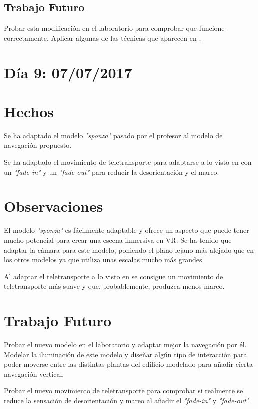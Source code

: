 \documentclass[12pt,a4paper]{article}
\begin{document}
\subsection{Trabajo Futuro}

Probar esta modificación en el laboratorio para comprobar que funcione correctamente.
Aplicar algunas de las técnicas que aparecen en \cite{Jerald 2016}.

\section{Día 9: 07/07/2017}

\section{Hechos}

Se ha adaptado el modelo \textit{"sponza"} pasado por el profesor al modelo de navegación propuesto.

Se ha adaptado el movimiento de teletransporte para adaptarse a lo visto en \cite{Jerald 2016} con un \textit{"fade-in"} y un \textit{"fade-out"} para reducir la desorientación y el mareo.

\section{Observaciones}

El modelo \textit{"sponza"} es fácilmente adaptable y ofrece un aspecto que puede tener mucho potencial para crear una escena inmersiva en VR. Se ha tenido que adaptar la cámara para este modelo, poniendo el plano lejano más alejado que en los otros modelos ya que utiliza unas escalas mucho más grandes.

Al adaptar el teletransporte a lo visto en \cite{Jerald 2016} se consigue un movimiento de teletransporte más suave y que, probablemente, produzca menos mareo.

\section{Trabajo Futuro}

Probar el nuevo modelo en el laboratorio y adaptar mejor la navegación por él. Modelar la iluminación de este modelo y diseñar algún tipo de interacción para poder moverse entre las distintas plantas del edificio modelado para añadir cierta navegación vertical.

Probar el nuevo movimiento de teletransporte para comprobar si realmente se reduce la sensación de desorientación y mareo al añadir el \textit{"fade-in"} y \textit{"fade-out"}.
\end{document}
